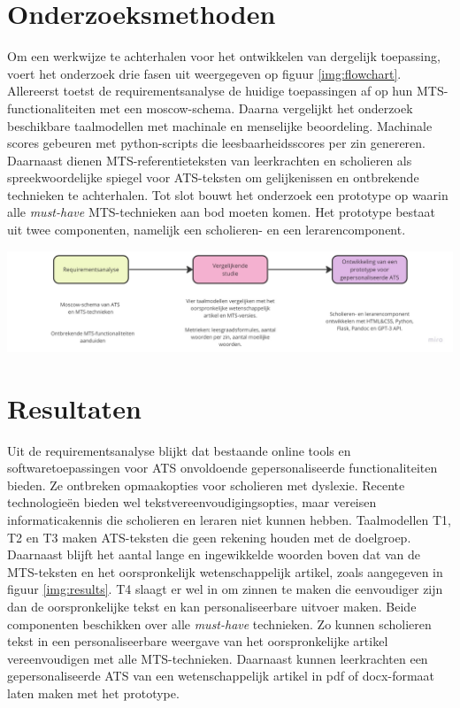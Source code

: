 \documentclass[a0,portrait]{hogent-poster}
\begin{document}
\begin{multicols}{2}
\section{Onderzoeksmethoden}

Om een werkwijze te achterhalen voor het ontwikkelen van dergelijk toepassing, voert het onderzoek drie fasen uit weergegeven op figuur \ref{img:flowchart}. Allereerst toetst de requirementsanalyse de huidige toepassingen af op hun MTS-functionaliteiten met een moscow-schema. Daarna vergelijkt het onderzoek beschikbare taalmodellen met machinale en menselijke beoordeling. Machinale scores gebeuren met python-scripts die leesbaarheidsscores per zin genereren. Daarnaast dienen MTS-referentieteksten van leerkrachten en scholieren als spreekwoordelijke spiegel voor ATS-teksten om gelijkenissen en ontbrekende technieken te achterhalen. Tot slot bouwt het onderzoek een prototype op waarin alle \textit{must-have} MTS-technieken aan bod moeten komen. Het prototype bestaat uit twee componenten, namelijk een scholieren- en een lerarencomponent.

\begin{center}
	\captionsetup{type=figure}
	\includegraphics[width=1.0\linewidth]{figures/onderzoeksmethoden.jpg}
	\label{img:flowchart}
\end{center}

\section{Resultaten}

Uit de requirementsanalyse blijkt dat bestaande online tools en softwaretoepassingen voor ATS onvoldoende gepersonaliseerde functionaliteiten bieden. Ze ontbreken opmaakopties voor scholieren met dyslexie. Recente technologieën bieden wel tekstvereenvoudigingsopties, maar vereisen informaticakennis die scholieren en leraren niet kunnen hebben. Taalmodellen T1, T2 en T3 maken ATS-teksten die geen rekening houden met de doelgroep. Daarnaast blijft het aantal lange en ingewikkelde woorden boven dat van de MTS-teksten en het oorspronkelijk wetenschappelijk artikel, zoals aangegeven in figuur \ref{img:results}. T4 slaagt er wel in om zinnen te maken die eenvoudiger zijn dan de oorspronkelijke tekst en kan personaliseerbare uitvoer maken. Beide componenten beschikken over alle \textit{must-have} technieken. Zo kunnen scholieren tekst in een personaliseerbare weergave van het oorspronkelijke artikel vereenvoudigen met alle MTS-technieken. Daarnaast kunnen leerkrachten een gepersonaliseerde ATS van een wetenschappelijk artikel in pdf of docx-formaat laten maken met het prototype.


\end{multicols}
\end{document}
